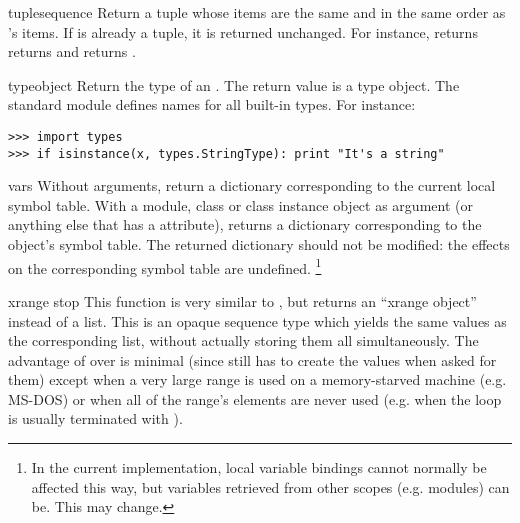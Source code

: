 \begin{funcdesc}{tuple}{sequence}
Return a tuple whose items are the same and in the same order as
's items.  If  is already a tuple, it
is returned unchanged.  For instance,  returns
returns  and  returns
.
\end{funcdesc}

\begin{funcdesc}{type}{object}
Return the type of an .  The return value is a type
object.  The standard module  defines names for all
built-in types.
For instance:

\begin{verbatim}
>>> import types
>>> if isinstance(x, types.StringType): print "It's a string"
\end{verbatim}
\end{funcdesc}

\begin{funcdesc}{vars}{}
Without arguments, return a dictionary corresponding to the current
local symbol table.  With a module, class or class instance object as
argument (or anything else that has a  attribute),
returns a dictionary corresponding to the object's symbol table.
The returned dictionary should not be modified: the effects on the
corresponding symbol table are undefined.%
\footnote{In the current implementation, local variable bindings
cannot normally be affected this way, but variables retrieved from
other scopes (e.g. modules) can be.  This may change.}
\end{funcdesc}

\begin{funcdesc}{xrange}{ stop}
This function is very similar to , but returns an
``xrange object'' instead of a list.  This is an opaque sequence type
which yields the same values as the corresponding list, without
actually storing them all simultaneously.  The advantage of
 over  is minimal (since 
still has to create the values when asked for them) except when a very
large range is used on a memory-starved machine (e.g. MS-DOS) or when all
of the range's elements are never used (e.g. when the loop is usually
terminated with ).
\end{funcdesc}
